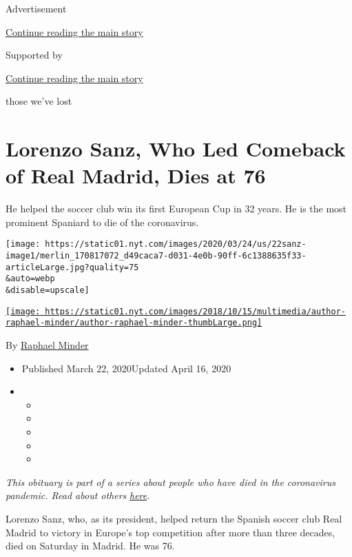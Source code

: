 Advertisement

\protect\hyperlink{after-top}{Continue reading the main story}

Supported by

\protect\hyperlink{after-sponsor}{Continue reading the main story}

those we've lost

\hypertarget{lorenzo-sanz-who-led-comeback-of-real-madrid-dies-at-76}{%
\section{Lorenzo Sanz, Who Led Comeback of Real Madrid, Dies at
76}\label{lorenzo-sanz-who-led-comeback-of-real-madrid-dies-at-76}}

He helped the soccer club win its first European Cup in 32 years. He is
the most prominent Spaniard to die of the coronavirus.

\texttt{[image: https://static01.nyt.com/images/2020/03/24/us/22sanz-image1/merlin\_170817072\_d49caca7-d031-4e0b-90ff-6c1388635f33-articleLarge.jpg?quality=75\\\&auto=webp\\\&disable=upscale]}

\href{https://www.nytimes.com/by/raphael-minder}{\texttt{[image: https://static01.nyt.com/images/2018/10/15/multimedia/author-raphael-minder/author-raphael-minder-thumbLarge.png]}}

By \href{https://www.nytimes.com/by/raphael-minder}{Raphael Minder}

\begin{itemize}
\item
  Published March 22, 2020Updated April 16, 2020
\item
  \begin{itemize}
  \item
  \item
  \item
  \item
  \item
  \end{itemize}
\end{itemize}

\emph{This obituary is part of a series about people who have died in
the coronavirus pandemic. Read about others}
\href{https://www.nytimes.com/series/people-who-have-died-of-the-coronavirus}{\emph{here}}\emph{.}

Lorenzo Sanz, who, as its president, helped return the Spanish soccer
club Real Madrid to victory in Europe's top competition after more than
three decades, died on Saturday in Madrid. He was 76.

